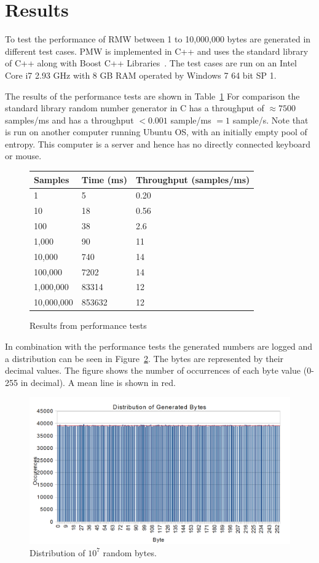 \section{Results}
\label{sec:result}
To test the performance of RMW between 1 to 10,000,000 bytes are generated in different test cases.
PMW is implemented in C++ and uses the standard library of C++ along with Boost C++ Libraries~\citep{boost}.
The test cases are run on an Intel Core i7 2.93 GHz with 8 GB RAM operated by Windows 7 64 bit SP 1.

The results of the performance tests are shown in Table~\ref{tab:tests}
For comparison the standard library random number generator in C has a throughput of $\approx 7500$ samples/ms and \devrandom{} has a throughput $<0.001$ sample/ms $=1$ sample/s.
Note that \devrandom{} is run on another computer running Ubuntu OS, with an initially empty pool of entropy.
This computer is a server and hence has no directly connected keyboard or mouse.

\begin{figure}[hbt]
	\centering
		\begin{tabular}{|l|l|l|}
			\hline
			Samples&Time (ms)&Throughput (samples/ms)\\
			\hline
			1&5&0.20\\
			\hline
			10&18&0.56\\
			\hline
			100&38&2.6\\
			\hline
			1,000&90&11\\
			\hline
			10,000&740&14\\
			\hline
			100,000&7202&14\\
			\hline
			1,000,000&83314&12\\
			\hline
			10,000,000&853632&12\\
			\hline
		\end{tabular}
	\caption{Results from performance tests}
	\label{tab:tests}
\end{figure}

In combination with the performance tests the generated numbers are logged and a distribution can be seen in Figure~\ref{fig:distribution}.
The bytes are represented by their decimal values.
The figure shows the number of occurrences of each byte value (0-255 in decimal).
A mean line is shown in red.

\begin{figure}[hbt]
	\centering
		\includegraphics[width=\columnwidth]{image/distribution.png}
	\caption{Distribution of $10^7$ random bytes.}
	\label{fig:distribution}
\end{figure}
